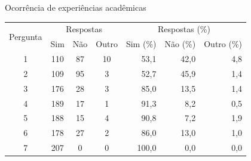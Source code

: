 \begin{apendicesenv}
  \begin{CenteredTable} \caption{Ocorrência de experiências acadêmicas} \label{table:3.0_satisfacao}
    \begin{tabular}{| c | c c c | r r r |}
      \hline
      \multicolumn{1}{|c|}{\multirow{2}{*}{Pergunta}} & \multicolumn{3}{c|}{Respostas} & \multicolumn{3}{c|}{Respostas (\%)}                                                                  \\
      \multicolumn{1}{|c|}{}                          & Sim                            & \multicolumn{1}{|c|}{Não}           & Outro & Sim (\%) & \multicolumn{1}{|c|}{Não (\%)} & Outro (\%) \\
      \hline
      1                                               & 110                            & 87                                  & 10    & 53,1     & 42,0                           & 4,8        \\ %
      2                                               & 109                            & 95                                  & 3     & 52,7     & 45,9                           & 1,4        \\ %
      3                                               & 176                            & 28                                  & 3     & 85,0     & 13,5                           & 1,4        \\ %
      4                                               & 189                            & 17                                  & 1     & 91,3     & 8,2                            & 0,5        \\ %
      5                                               & 188                            & 15                                  & 4     & 90,8     & 7,2                            & 1,9        \\ %
      6                                               & 178                            & 27                                  & 2     & 86,0     & 13,0                           & 1,0        \\ %
      7                                               & 207                            & 0                                   & 0     & 100,0    & 0,0                            & 0,0        \\ %
      \hline
    \end{tabular}
  \end{CenteredTable}


\end{apendicesenv}
